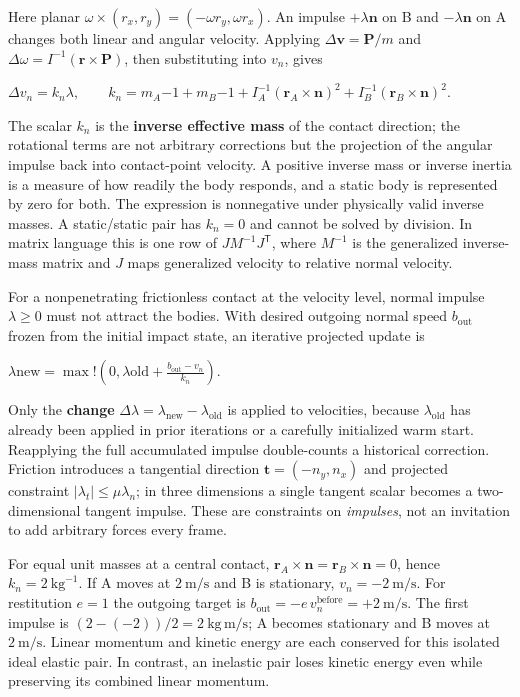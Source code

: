 Here planar \(\omega\times(r_x,r_y)=(-\omega r_y,\omega r_x)\). An impulse \(+\lambda\mathbf n\) on B and \(-\lambda\mathbf n\) on A changes both linear and angular velocity. Applying \(\Delta\mathbf v=\mathbf P/m\) and \(\Delta\omega=I^{-1}(\mathbf r\times\mathbf P)\), then substituting into \(v_n\), gives

\(\Delta v_n=k_n\lambda,\qquad k_n=m_A{-1}+m_B{-1} +I_A^{-1}(\mathbf r_A\times\mathbf n)^2 +I_B^{-1}(\mathbf r_B\times\mathbf n)^2.\)

The scalar \(k_n\) is the \textbf{inverse effective mass} of the contact direction; the rotational terms are not arbitrary corrections but the projection of the angular impulse back into contact-point velocity. A positive inverse mass or inverse inertia is a measure of how readily the body responds, and a static body is represented by zero for both. The expression is nonnegative under physically valid inverse masses. A static/static pair has \(k_n=0\) and cannot be solved by division. In matrix language this is one row of \(JM^{-1}J^\mathsf T\), where \(M^{-1}\) is the generalized inverse-mass matrix and \(J\) maps generalized velocity to relative normal velocity.

For a nonpenetrating frictionless contact at the velocity level, normal impulse \(\lambda\ge0\) must not attract the bodies. With desired outgoing normal speed \(b_{\mathrm{out}}\) frozen from the initial impact state, an iterative projected update is

\(\lambda{\mathrm{new}}=\max!\left(0,\lambda{\mathrm{old}} +\frac{b_{\mathrm{out}}-v_n}{k_n}\right).\)

Only the \textbf{change} \(\Delta\lambda=\lambda_{\mathrm{new}}-\lambda_{\mathrm{old}}\) is applied to velocities, because \(\lambda_{\mathrm{old}}\) has already been applied in prior iterations or a carefully initialized warm start. Reapplying the full accumulated impulse double-counts a historical correction. Friction introduces a tangential direction \(\mathbf t=(-n_y,n_x)\) and projected constraint \(|\lambda_t|\le\mu\lambda_n\); in three dimensions a single tangent scalar becomes a two-dimensional tangent impulse. These are constraints on \emph{impulses}, not an invitation to add arbitrary forces every frame.

For equal unit masses at a central contact, \(\mathbf r_A\times\mathbf n=\mathbf r_B\times\mathbf n=0\), hence \(k_n=2\ \mathrm{kg}^{-1}\). If A moves at \(2\ \mathrm{m/s}\) and B is stationary, \(v_n=-2\ \mathrm{m/s}\). For restitution \(e=1\) the outgoing target is \(b_{\mathrm{out}}=-e\,v_n^{\mathrm{before}}=+2\ \mathrm{m/s}\). The first impulse is \((2-(-2))/2=2\ \mathrm{kg\,m/s}\); A becomes stationary and B moves at \(2\ \mathrm{m/s}\). Linear momentum and kinetic energy are each conserved for this isolated ideal elastic pair. In contrast, an inelastic pair loses kinetic energy even while preserving its combined linear momentum.

